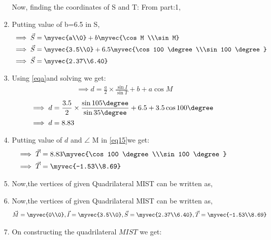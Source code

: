 \documentclass[journal,12pt,twocolumn]{IEEEtran}
\begin{document}
\begin{enumerate}
\begin{itemize}
\begin{enumerate}
Now, finding the coordinates of S and T:
From part:1, 
\item Putting value of b=6.5 in S, 
\begin{align}
&\implies \vec{S}=\myvec{a\\0} +b\myvec{\cos M \\\sin M}
\\
&\implies \vec{S}=\myvec{3.5\\0} +6.5\myvec{\cos 100 \degree\\\sin 100 \degree} 
\\
&\implies \vec{S}=\myvec{2.37\\6.40}
\end{align}
\item Using \eqref{eqa}and solving we get:
\begin{align}
&\implies d=\frac{a}{2}\times\frac{\sin I}{\sin T}+ b+a \cos M 
\end{align}
\begin{align}
&\implies d=\frac{3.5}{2}\times\frac{\sin 105 \degree}{\sin 35 \degree}+ 6.5+3.5 \cos100 \degree
\\
&\implies d=8.83
\end{align}
\item Putting value of $d$  and $\angle$ M in \eqref{eq15}we get:
\begin{align}
&\implies \vec{T} =8.83\myvec{\cos 100 \degree\\\sin 100 \degree}
\\
&\implies \vec{T}=\myvec{-1.53\\8.69} 
\end{align}
   \item Now,the vertices of given Quadrilateral MIST can be written as,
\item Now,the vertices of given Quadrilateral MIST can be written as,
\begin{align}
 \vec{M}=\myvec{0\\0},\vec{I}=\myvec{3.5\\0},
 \vec{S}=\myvec{2.37\\6.40},\vec{T}=\myvec{-1.53\\8.69}
 \end{align}
    \item On constructing the quadrilateral $MIST$ we get:
\end{enumerate}
\end{itemize}
\begin{figure}[!ht]
\centering

\end{figure}
\end{enumerate}
\end{document}
